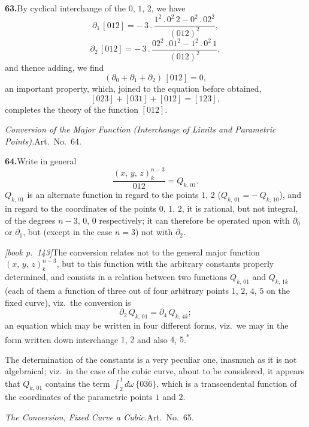 \documentclass[11pt,a4paper]{article}
\theoremstyle{plain}
\theoremstyle{definition}
\theoremstyle{remark}
\providecommand{\bdet}[1]{\overline{#1}}
\begin{document}
\medskip\noindent\textbf{63.}\quad By cyclical interchange of the $0$, $1$, $2$, we have
\[
\partial_1\,[012] = -\,3\,.\,\frac{1^{2}\,.\,0^{2}\,2 - 0^{2}\,.\,02^{2}}{(012)^{2}},
\]
\[
\partial_2\,[012] = -\,3\,.\,\frac{02^{2}\,.\,01^{2} - 1^{2}\,.\,0^{2}\,1}{(012)^{2}},
\]
and thence adding, we find
\[
(\partial_0 + \partial_1 + \partial_2)\,[012] = 0,
\]
an important property, which, joined to the equation before obtained,
\[
[023] + [031] + [012] = [123],
\]
completes the theory of the function $[012]$.

\medskip\noindent\textit{Conversion of the Major Function (Interchange of Limits and Parametric Points).}\quad Art.\ No.\ 64.

\medskip\noindent\textbf{64.}\quad Write in general
\[
\frac{(x,\,y,\,z)^{n-3}_{k}}{012} = Q_{k,\,01}.
\]
$Q_{k,\,01}$ is an alternate function in regard to the points $1$, $2$ ($Q_{k,\,01} = -\,Q_{k,\,10}$), and in regard to the coordinates of the points $0$, $1$, $2$, it is rational, but not integral, of the degrees $n - 3$, $0$, $0$ respectively; it can therefore be operated upon with $\partial_0$ or $\partial_1$, but (except in the case $n = 3$) not with $\partial_2$.

\medskip\noindent\textit{[book p.~143]}\quad The conversion relates not to the general major function $(x,\,y,\,z)^{n-3}_{k}$, but to this function with the arbitrary constants properly determined, and consists in a relation between two functions $Q_{k,\,01}$ and $Q_{k,\,1k}$ (each of them a function of three out of four arbitrary points $1$, $2$, $4$, $5$ on the fixed curve), viz.\ the conversion is
\[
\partial_2\,Q_{k,\,01} = \partial_4\,Q_{k,\,4k};
\]
an equation which may be written in four different forms, viz.\ we may in the form written down interchange $1$, $2$ and also $4$, $5$.\textsuperscript{*}

The determination of the constants is a very peculiar one, inasmuch as it is not algebraical; viz.\ in the case of the cubic curve, about to be considered, it appears that $Q_{k,\,01}$ contains the term $\int_2^1 d\omega\,\bigl\{0\bdet{36}\bigr\}$, which is a transcendental function of the coordinates of the parametric points $1$ and $2$.

\medskip\noindent\textit{The Conversion, Fixed Curve a Cubic.}\quad Art.\ No.\ 65.
\end{document}

